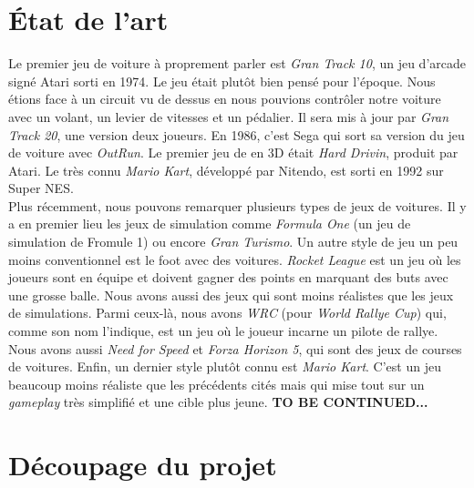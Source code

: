\documentclass[11pt,a4paper]{article}
\begin{document}
\section{État de l'art}
  Le premier jeu de voiture à proprement parler est \textit{Gran Track 10}, un jeu d'arcade signé Atari 
  sorti en 1974. Le jeu était plutôt bien pensé pour l'époque. Nous étions face à un 
  circuit vu de dessus en nous pouvions contrôler notre voiture avec un volant, un levier de vitesses
  et un pédalier. Il sera mis à jour par \textit{Gran Track 20}, une version deux joueurs.
  En 1986, c'est Sega qui sort sa version du jeu de voiture avec \textit{OutRun}. Le premier 
  jeu de en 3D était \textit{Hard Drivin}, produit par Atari. Le très connu \textit{Mario Kart},
  développé par Nitendo, est sorti en 1992 sur Super NES.\\
  \indent Plus récemment, nous pouvons remarquer plusieurs types de jeux de voitures. Il y a en premier lieu 
  les jeux de simulation comme \textit{Formula One} (un jeu de simulation de Fromule 1) ou encore 
  \textit{Gran Turismo}. Un autre style de jeu un peu moins conventionnel est le foot avec des voitures. 
  \textit{Rocket League} est un jeu où les joueurs sont en équipe  et doivent gagner des
  points en marquant des buts avec une grosse balle. Nous avons aussi des jeux qui sont moins réalistes
  que les jeux de simulations. Parmi ceux-là, nous avons \textit{WRC} (pour \textit{World Rallye Cup})
  qui, comme son nom l'indique, est un jeu où le joueur incarne un pilote de rallye. Nous avons aussi 
  \textit{Need for Speed} et \textit{Forza Horizon 5}, qui sont des jeux de courses de voitures.
  Enfin, un dernier style plutôt connu est \textit{Mario Kart}. C'est un jeu beaucoup moins réaliste
  que les précédents cités mais qui mise tout sur un \textit{gameplay} très simplifié et une cible plus
  jeune.
  \textbf{TO BE CONTINUED...}
\clearpage

\section{Découpage du projet}
\end{document}
